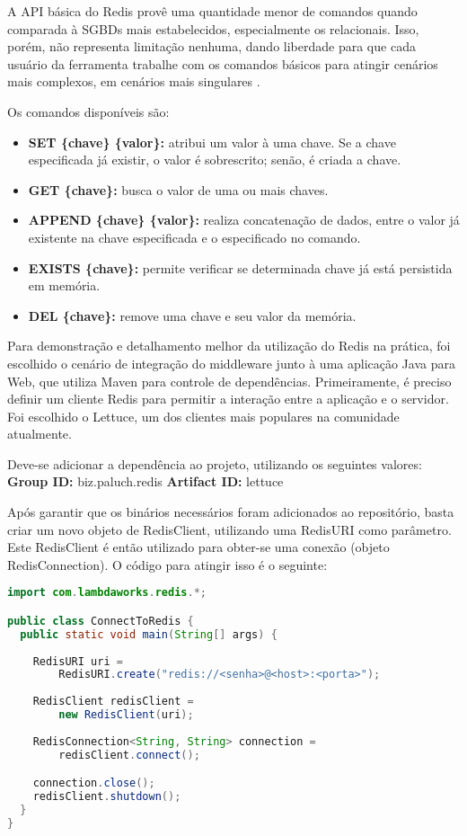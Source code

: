 \documentclass[12pt]{article}
\begin{document}
A API básica do Redis provê uma quantidade menor de comandos quando comparada à SGBDs mais estabelecidos, especialmente os relacionais. Isso, porém, não representa limitação nenhuma, dando liberdade para que cada usuário da ferramenta trabalhe com os comandos básicos para atingir cenários mais complexos, em cenários mais singulares \cite{paksula:10}.

Os comandos disponíveis são:

\begin{itemize}
    \item \textbf{SET \{chave\} \{valor\}:} atribui um valor à uma chave. Se a chave especificada já existir, o valor é sobrescrito; senão, é criada a chave.
    \item \textbf{GET \{chave\}:} busca o valor de uma ou mais chaves.
    \item \textbf{APPEND \{chave\} \{valor\}:} realiza concatenação de dados, entre o valor já existente na chave especificada e o especificado no comando.
    \item \textbf{EXISTS \{chave\}:} permite verificar se determinada chave já está persistida em memória.
    \item \textbf{DEL \{chave\}:} remove uma chave e seu valor da memória.
\end{itemize}

Para demonstração e detalhamento melhor da utilização do Redis na prática, foi escolhido o cenário de integração do middleware junto à uma aplicação Java para Web, que utiliza Maven para controle de dependências. Primeiramente, é preciso definir um cliente Redis para permitir a interação entre a aplicação e o servidor. Foi escolhido o Lettuce, um dos clientes mais populares na comunidade atualmente.

Deve-se adicionar a dependência ao projeto, utilizando os seguintes valores:
\newline
\textbf{Group ID: } biz.paluch.redis
\newline
\textbf{Artifact ID: }lettuce

Após garantir que os binários necessários foram adicionados ao repositório, basta criar um novo objeto de RedisClient, utilizando uma RedisURI como parâmetro. Este RedisClient é então utilizado para obter-se uma conexão (objeto RedisConnection). O código para atingir isso é o seguinte:

\begin{lstlisting}[language=Java]
import com.lambdaworks.redis.*;

public class ConnectToRedis {
  public static void main(String[] args) {
  
    RedisURI uri =
        RedisURI.create("redis://<senha>@<host>:<porta>");
  
    RedisClient redisClient =
        new RedisClient(uri);
    
    RedisConnection<String, String> connection =
        redisClient.connect();

    connection.close();
    redisClient.shutdown();
  }
}
\end{lstlisting}
\end{document}
